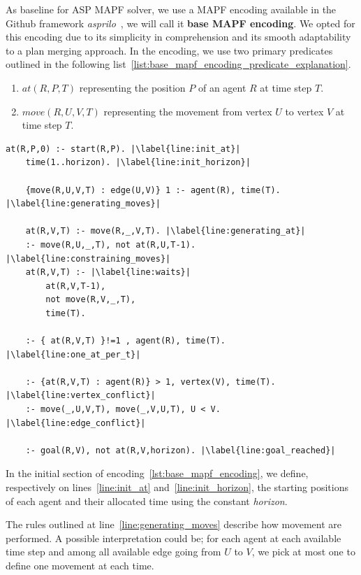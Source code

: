 As baseline for ASP MAPF solver, we use a MAPF encoding available in the Github framework \textit{asprilo}~\cite{geobotscsangso18a}, we will call it \textbf{base MAPF encoding}. We opted for this encoding due to its simplicity in comprehension and its smooth adaptability to a plan merging approach. In the encoding, we use two primary predicates outlined in the following list~\ref{list:base_mapf_encoding_predicate_explanation}.

\begin{enumerate}\label{list:base_mapf_encoding_predicate_explanation}
    \item \(at(R,P,T)\)  representing the position \(P\) of an agent \(R\) at time step \(T\).
    \item \(move(R,U,V,T)\) representing the movement from vertex \(U\) to vertex \(V\) at time step \(T\).
\end{enumerate}

\begin{minipage}[H]{\linewidth}
\begin{lstlisting}[style=mystyle, caption={Base MAPF encoding}, label={lst:base_mapf_encoding}]
    at(R,P,0) :- start(R,P). |\label{line:init_at}|
    time(1..horizon). |\label{line:init_horizon}|

    {move(R,U,V,T) : edge(U,V)} 1 :- agent(R), time(T). |\label{line:generating_moves}|

    at(R,V,T) :- move(R,_,V,T). |\label{line:generating_at}|
    :- move(R,U,_,T), not at(R,U,T-1). |\label{line:constraining_moves}|
    at(R,V,T) :- |\label{line:waits}|
        at(R,V,T-1), 
        not move(R,V,_,T), 
        time(T). 

    :- { at(R,V,T) }!=1 , agent(R), time(T). |\label{line:one_at_per_t}|

    :- {at(R,V,T) : agent(R)} > 1, vertex(V), time(T). |\label{line:vertex_conflict}|
    :- move(_,U,V,T), move(_,V,U,T), U < V. |\label{line:edge_conflict}|
        
    :- goal(R,V), not at(R,V,horizon). |\label{line:goal_reached}|
\end{lstlisting}
\end{minipage}

In the initial section of encoding~\ref{lst:base_mapf_encoding}, we define, respectively on lines~\ref{line:init_at} and~\ref{line:init_horizon}, the starting positions of each agent and their allocated time using the constant \textit{horizon}.


The rules outlined at line~\ref{line:generating_moves} describe how movement are performed. A possible interpretation could be; for each agent at each available time step and among all available edge going from \(U\) to \(V\), we pick at most one to define one movement at each time.

